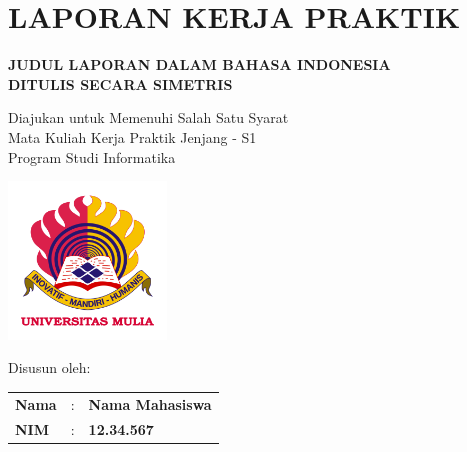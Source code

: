 \documentclass[oneside,listof=totoc]{scrbook}
\newcommand{\JudulLaporanKP}{JUDUL LAPORAN DALAM BAHASA INDONESIA \\ DITULIS SECARA SIMETRIS}
\newcommand{\NamaMahasiswa}{Nama Mahasiswa}
\newcommand{\NIM}{12.34.567}
\begin{document}
\chapter{LAPORAN KERJA PRAKTIK}

\vspace{1.0cm}

\begin{center}
  \normalsize{\textbf{\JudulLaporanKP}}
\end{center}

\vspace{0.5cm}

\begin{center}
  \normalsize{Diajukan untuk Memenuhi Salah Satu Syarat}\\
  \normalsize{Mata Kuliah Kerja Praktik Jenjang - S1}\\
  \normalsize{Program Studi Informatika}\\
\end{center}

\vspace{1.5cm}

\begin{minipage}{12.2cm}
  \centering
    \includegraphics[width=4.20cm]{gambar/logo_um}
\end{minipage}

\vspace{1.5cm}

\begin{center}
  \normalsize{Disusun oleh:}\\
  \vspace{0.2cm}
  \begin{minipage}{\textwidth}
    \begin{center}
      \begin{tabular}{l r l}
        \textbf{Nama} & : & \textbf{\NamaMahasiswa}\\
        \textbf{NIM}  & : & \textbf{\NIM}
      \end{tabular}
    \end{center}
  \end{minipage}
\end{center}
\end{document}
